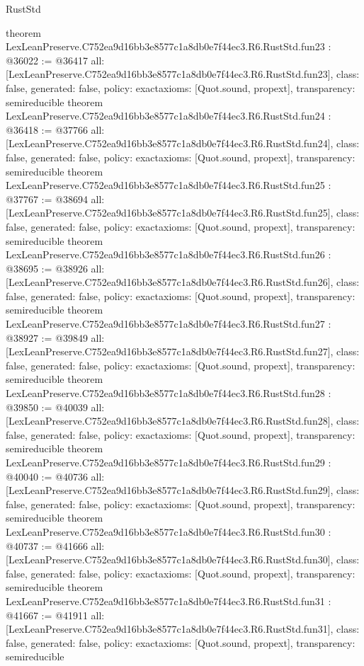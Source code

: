 \begin{lexlean}{RustStd}
\begin{coremodule}
{}
theorem LexLeanPreserve.C752ea9d16bb3e8577c1a8db0e7f44ec3.R6.RustStd.fun23 : @36022 := @36417 {
  all: [LexLeanPreserve.C752ea9d16bb3e8577c1a8db0e7f44ec3.R6.RustStd.fun23],
  class: false,
  generated: false,
  policy: exact{axioms: [Quot.sound, propext]},
  transparency: semireducible
}
theorem LexLeanPreserve.C752ea9d16bb3e8577c1a8db0e7f44ec3.R6.RustStd.fun24 : @36418 := @37766 {
  all: [LexLeanPreserve.C752ea9d16bb3e8577c1a8db0e7f44ec3.R6.RustStd.fun24],
  class: false,
  generated: false,
  policy: exact{axioms: [Quot.sound, propext]},
  transparency: semireducible
}
theorem LexLeanPreserve.C752ea9d16bb3e8577c1a8db0e7f44ec3.R6.RustStd.fun25 : @37767 := @38694 {
  all: [LexLeanPreserve.C752ea9d16bb3e8577c1a8db0e7f44ec3.R6.RustStd.fun25],
  class: false,
  generated: false,
  policy: exact{axioms: [Quot.sound, propext]},
  transparency: semireducible
}
theorem LexLeanPreserve.C752ea9d16bb3e8577c1a8db0e7f44ec3.R6.RustStd.fun26 : @38695 := @38926 {
  all: [LexLeanPreserve.C752ea9d16bb3e8577c1a8db0e7f44ec3.R6.RustStd.fun26],
  class: false,
  generated: false,
  policy: exact{axioms: [Quot.sound, propext]},
  transparency: semireducible
}
theorem LexLeanPreserve.C752ea9d16bb3e8577c1a8db0e7f44ec3.R6.RustStd.fun27 : @38927 := @39849 {
  all: [LexLeanPreserve.C752ea9d16bb3e8577c1a8db0e7f44ec3.R6.RustStd.fun27],
  class: false,
  generated: false,
  policy: exact{axioms: [Quot.sound, propext]},
  transparency: semireducible
}
theorem LexLeanPreserve.C752ea9d16bb3e8577c1a8db0e7f44ec3.R6.RustStd.fun28 : @39850 := @40039 {
  all: [LexLeanPreserve.C752ea9d16bb3e8577c1a8db0e7f44ec3.R6.RustStd.fun28],
  class: false,
  generated: false,
  policy: exact{axioms: [Quot.sound, propext]},
  transparency: semireducible
}
theorem LexLeanPreserve.C752ea9d16bb3e8577c1a8db0e7f44ec3.R6.RustStd.fun29 : @40040 := @40736 {
  all: [LexLeanPreserve.C752ea9d16bb3e8577c1a8db0e7f44ec3.R6.RustStd.fun29],
  class: false,
  generated: false,
  policy: exact{axioms: [Quot.sound, propext]},
  transparency: semireducible
}
theorem LexLeanPreserve.C752ea9d16bb3e8577c1a8db0e7f44ec3.R6.RustStd.fun30 : @40737 := @41666 {
  all: [LexLeanPreserve.C752ea9d16bb3e8577c1a8db0e7f44ec3.R6.RustStd.fun30],
  class: false,
  generated: false,
  policy: exact{axioms: [Quot.sound, propext]},
  transparency: semireducible
}
theorem LexLeanPreserve.C752ea9d16bb3e8577c1a8db0e7f44ec3.R6.RustStd.fun31 : @41667 := @41911 {
  all: [LexLeanPreserve.C752ea9d16bb3e8577c1a8db0e7f44ec3.R6.RustStd.fun31],
  class: false,
  generated: false,
  policy: exact{axioms: [Quot.sound, propext]},
  transparency: semireducible
}
\end{coremodule}
\end{lexlean}
